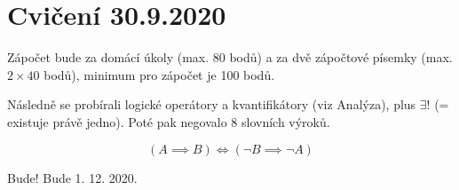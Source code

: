 \documentclass[12pt]{article}					%
\begin{document}
\section{Cvičení 30.9.2020}
    \begin{poznamka}[Zápočet]
        Zápočet bude za domácí úkoly (max. 80 bodů) a za dvě zápočtové písemky (max. $2 \times 40$ bodů), minimum pro zápočet je 100 bodů.
    \end{poznamka}
    Následně se probírali logické operátory a kvantifikátory (viz Analýza), plus $\exists!$ (= existuje právě jedno). Poté pak negovalo 8 slovních výroků.

    \begin{upozorneni}
            $$ (A \implies B) \Leftrightarrow (\neg B \implies \neg A) $$
    \end{upozorneni}


    \begin{poznamka}
        Bude! Bude 1. 12. 2020.
    \end{poznamka}
\end{document}
